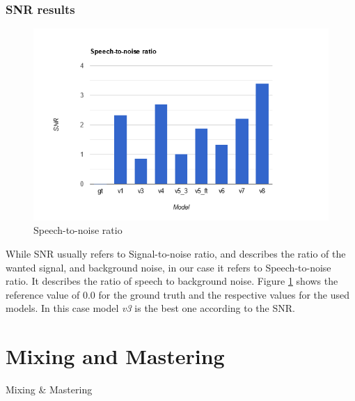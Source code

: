 \documentclass[a4paper]{article}
\begin{document}
	\subsubsection{SNR results}
	\begin{figure}[hbtp]
		\includegraphics[width=\textwidth]{evaluation/graphs/SNR.png}
		\caption{Speech-to-noise ratio}
		\label{fig:snr}
	\end{figure}
	
	While SNR usually refers to Signal-to-noise ratio, and describes the ratio of
	the wanted signal, and background noise, in our case it refers to
	Speech-to-noise ratio. It describes the ratio of speech to background noise.
	Figure \ref{fig:snr} shows the reference value of 0.0 for the ground truth and
	the respective values for the used models. In this case model \emph{v3} is the
	best one according to the SNR.
	
	\section{Mixing and Mastering}

 	Mixing & Mastering
\end{document}
